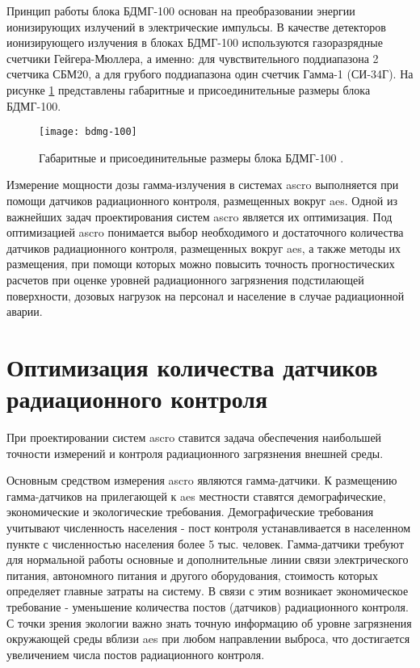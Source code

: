 Принцип работы блока БДМГ-100 основан на преобразовании энергии ионизирующих излучений в электрические импульсы. В 
качестве детекторов ионизирующего излучения в блоках БДМГ-100 используются газоразрядные счетчики Гейгера-Мюллера, а 
именно: для чувствительного поддиапазона 2 счетчика СБМ20, а для грубого поддиапазона один счетчик Гамма-1 (СИ-34Г). На 
рисунке \ref{fig_bdmg_100} представлены габаритные и присоединительные размеры блока БДМГ-100.

\begin{figure}[ht!]
    \centering
    \texttt{[image: bdmg-100]}
    \captionsetup{justification=centering}
    \caption{Габаритные и присоединительные размеры блока БДМГ-100 \cite{bdmg-100}.}
    \label{fig_bdmg_100}
\end{figure}

Измерение мощности дозы гамма-излучения в системах \ac{ascro} выполняется при помощи датчиков радиационного контроля, 
размещенных вокруг \ac{aes}. Одной из важнейших задач проектирования систем \ac{ascro} является их оптимизация. Под 
оптимизацией \ac{ascro} понимается выбор необходимого и достаточного количества датчиков радиационного контроля, 
размещенных вокруг \ac{aes}, а также методы их размещения, при помощи которых можно повысить точность прогностических 
расчетов при оценке уровней радиационного загрязнения подстилающей поверхности, дозовых нагрузок на персонал и население 
в случае радиационной аварии.

\section{Оптимизация количества датчиков радиационного контроля}

При проектировании систем \ac{ascro} ставится задача обеспечения наибольшей точности измерений и контроля радиационного 
загрязнения внешней среды. 

Основным средством измерения \ac{ascro} являются гамма-датчики. К размещению гамма-датчиков на прилегающей к \ac{aes} 
местности ставятся демографические, экономические и экологические требования. Демографические требования учитывают 
численность населения - пост контроля устанавливается в населенном пункте с численностью населения более 5 тыс. человек. 
Гамма-датчики требуют для нормальной работы основные и дополнительные линии связи электрического питания, автономного 
питания и другого оборудования, стоимость которых определяет главные затраты на систему. В связи с этим возникает 
экономическое требование - уменьшение количества постов (датчиков) радиационного контроля. С точки зрения экологии 
важно знать точную информацию об уровне загрязнения окружающей среды вблизи \ac{aes} при любом направлении выброса, что 
достигается увеличением числа постов радиационного контроля.

